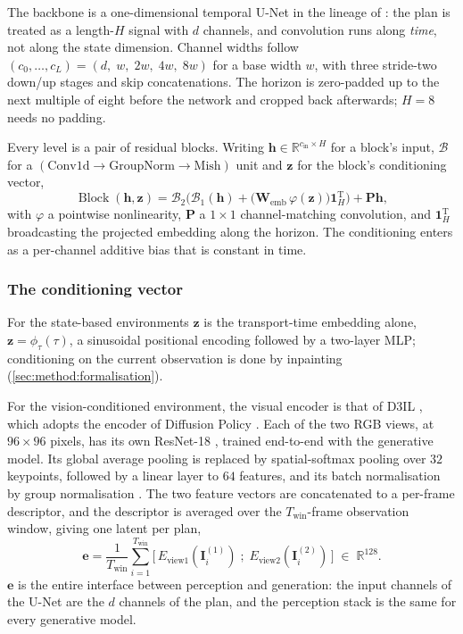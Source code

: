 \documentclass[headsepline,footsepline,footinclude=false,oneside,fontsize=11pt,paper=a4,listof=totoc,bibliography=totoc]{scrbook}
\theoremstyle{definition}
\theoremstyle{plain}
\theoremstyle{remark}
\newcommand{\vect}[1]{\boldsymbol{#1}}
\newcommand{\matr}[1]{\boldsymbol{#1}}
\newcommand{\trans}{^{\textrm{T}}}
\newcommand{\sidx}[1]{_{\textrm{#1}}}
\newcommand{\R}{\mathbb{R}}                    %
\newcommand{\ftime}{\tau}                      %
\begin{document}
The backbone is a one-dimensional temporal U-Net in the lineage of
\parencite{janner2022planning}: the plan is treated as a length-$H$ signal with $d$ channels,
and convolution runs along \emph{time}, not along the state dimension. Channel widths follow
$\left(c_{0},\dots,c_{L}\right) = \left(d,\;w,\;2w,\;4w,\;8w\right)$ for a base width $w$, with
three stride-two down/up stages and skip concatenations. The horizon is zero-padded up to the next
multiple of eight before the network and cropped back afterwards; $H = 8$ needs no padding.

Every level is a pair of residual blocks. Writing $\vect{h}\in\R^{c\sidx{in}\times H}$ for a block's
input, $\mathcal{B}$ for a $\left(\text{Conv1d}\to\text{GroupNorm}\to\text{Mish}\right)$ unit and
$\vect{z}$ for the block's conditioning vector,
\begin{equation}\label{eq:method:backbone:block}
  \operatorname{Block}(\vect{h},\vect{z})
  = \mathcal{B}_{2}\Big(\mathcal{B}_{1}(\vect{h}) + \big(\matr{W}\sidx{emb}\,\varphi(\vect{z})\big)\vect{1}_{H}\trans\Big)
    + \matr{P}\vect{h},
\end{equation}
with $\varphi$ a pointwise nonlinearity, $\matr{P}$ a $1\times1$ channel-matching convolution, and
$\vect{1}_{H}\trans$ broadcasting the projected embedding along the horizon. The conditioning
enters as a per-channel additive bias that is constant in time.

\subsubsection*{The conditioning vector}

For the state-based environments $\vect{z}$ is the transport-time embedding alone,
$\vect{z} = \phi_{\ftime}(\ftime)$, a sinusoidal positional encoding followed by a two-layer MLP;
conditioning on the current observation is done by inpainting
(\autoref{sec:method:formalisation}).

For the vision-conditioned environment, the visual encoder is that of D3IL \parencite{jia2024towards},
which adopts the encoder of Diffusion Policy \parencite[Sec.~3.2]{chi2023diffusion}. Each of the two
RGB views, at $96\times96$ pixels, has its own ResNet-18 \parencite{he2016deep}, trained end-to-end
with the generative model. Its global average pooling is replaced by spatial-softmax pooling
\parencite{mandlekar2021matters} over $32$ keypoints, followed by a linear layer to $64$ features, and
its batch normalisation by group normalisation \parencite{wu2018group}. The two feature vectors are
concatenated to a per-frame descriptor, and the descriptor is averaged over the
$T\sidx{win}$-frame observation window, giving one latent per plan,
\begin{equation}\label{eq:method:backbone:latent}
  \vect{e}
  = \frac{1}{T\sidx{win}}\sum_{i=1}^{T\sidx{win}}
    \Big[\,E\sidx{view1}(\matr{I}^{(1)}_{i})\;;\;E\sidx{view2}(\matr{I}^{(2)}_{i})\,\Big]
  \;\in\;\R^{128}.
\end{equation}
$\vect{e}$ is the entire interface between perception and generation: the input channels of the
U-Net are the $d$ channels of the plan, and the perception stack is the same for every generative
model.
\end{document}
